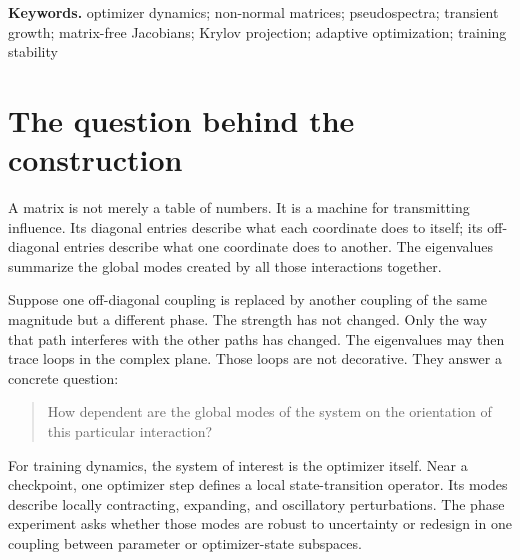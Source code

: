 \documentclass[11pt]{article}
\theoremstyle{definition}
\theoremstyle{remark}
\begin{document}
\noindent\textbf{Keywords.} optimizer dynamics; non-normal matrices; pseudospectra; transient growth; matrix-free Jacobians; Krylov projection; adaptive optimization; training stability

\tableofcontents
\newpage

\section{The question behind the construction}

A matrix is not merely a table of numbers.  It is a machine for transmitting influence.  Its diagonal entries describe what each coordinate does to itself; its off-diagonal entries describe what one coordinate does to another.  The eigenvalues summarize the global modes created by all those interactions together.

Suppose one off-diagonal coupling is replaced by another coupling of the same magnitude but a different phase.  The strength has not changed.  Only the way that path interferes with the other paths has changed.  The eigenvalues may then trace loops in the complex plane.  Those loops are not decorative.  They answer a concrete question:

\begin{quote}
How dependent are the global modes of the system on the orientation of this particular interaction?
\end{quote}

For training dynamics, the system of interest is the optimizer itself.  Near a checkpoint, one optimizer step defines a local state-transition operator.  Its modes describe locally contracting, expanding, and oscillatory perturbations.  The phase experiment asks whether those modes are robust to uncertainty or redesign in one coupling between parameter or optimizer-state subspaces.
\end{document}

